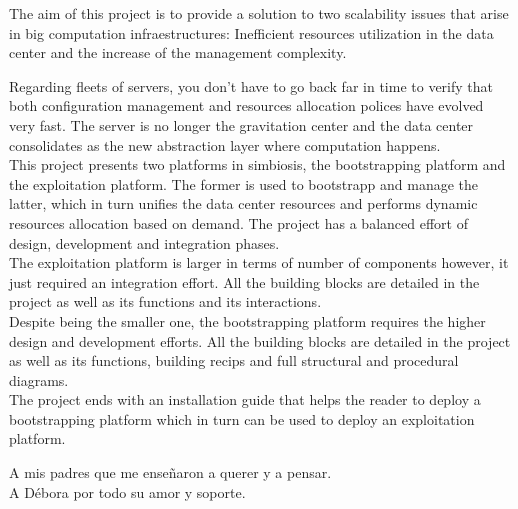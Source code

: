 \documentclass[a4paper,12pt,spanish,final]{epsc_tfc_pfc}
\begin{document}
\begin{overview}{1cm}
The aim of this project is to provide a solution to two scalability issues that arise in big computation infraestructures: Inefficient resources utilization in the data center and the increase of the management complexity.

Regarding fleets of servers, you don't have to go back far in time to verify that both configuration management and resources allocation polices have evolved very fast. The server is no longer the gravitation center and the data center consolidates as the new abstraction layer where computation happens.\\

This project presents two platforms in simbiosis, the bootstrapping platform and the exploitation platform. The former is used to bootstrapp and manage the latter, which in turn unifies the data center resources and performs dynamic resources allocation based on demand. The project has a balanced effort of design, development and integration phases.\\

The exploitation platform is larger in terms of number of components however, it just required an integration effort. All the building blocks are detailed in the project as well as its functions and its interactions.\\

Despite being the smaller one, the bootstrapping platform requires the higher design and development efforts. All the building blocks are detailed in the project as well as its functions, building recips and full structural and procedural diagrams.\\

The project ends with an installation guide that helps the reader to deploy a bootstrapping platform which in turn can be used to deploy an exploitation platform.
\end{overview}



\begin{dedicatoria}
A mis padres que me enseñaron a querer y a pensar.\\
A Débora por todo su amor y soporte.
\end{dedicatoria}


\thispagestyle{empty}
\tableofcontents
\cleardoublepage{}
\thispagestyle{empty}
\listoffigures
\cleardoublepage{}
\thispagestyle{empty}
\listoftables
\cleardoublepage{}
\pagestyle{fancy}
\end{document}
